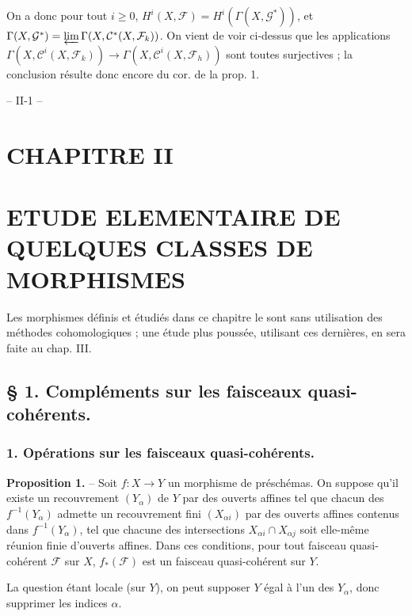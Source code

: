 On a donc pour tout $i \ge 0$, $H^i(X, \mathcal{F}) = H^i(\Gamma(X, \mathcal{G}^*))$, et $\Gamma(X, \mathcal{G}^*) = \varprojlim \Gamma(X, \mathcal{C}^*(X, \mathcal{F}_k))$. On vient de voir ci-dessus que les applications $\Gamma(X, \mathcal{C}^i(X, \mathcal{F}_k)) \to \Gamma(X, \mathcal{C}^i(X, \mathcal{F}_h))$ sont toutes surjectives ; la conclusion résulte donc encore du cor. de la prop. 1.

\newpage



\begin{center}
-- II-1 --
\end{center}

\section*{CHAPITRE II}
\section*{ETUDE ELEMENTAIRE DE QUELQUES CLASSES DE MORPHISMES}

Les morphismes définis et étudiés dans ce chapitre le sont sans utilisation des méthodes cohomologiques ; une étude plus poussée, utilisant ces dernières, en sera faite au chap. III.

\subsection*{§ 1. Compléments sur les faisceaux quasi-cohérents.}

\subsubsection*{1. Opérations sur les faisceaux quasi-cohérents.}

\textbf{Proposition 1.} -- Soit $f : X \to Y$ un morphisme de préschémas. On suppose qu'il existe un recouvrement $(Y_\alpha)$ de $Y$ par des ouverts affines tel que chacun des $f^{-1}(Y_\alpha)$ admette un recouvrement fini $(X_{\alpha i})$ par des ouverts affines contenus dans $f^{-1}(Y_\alpha)$, tel que chacune des intersections $X_{\alpha i} \cap X_{\alpha j}$ soit elle-même réunion finie d'ouverts affines. Dans ces conditions, pour tout faisceau quasi-cohérent $\mathcal{F}$ sur $X$, $f_*(\mathcal{F})$ est un faisceau quasi-cohérent sur $Y$.

La question étant locale (sur $Y$), on peut supposer $Y$ égal à l'un des $Y_\alpha$, donc supprimer les indices $\alpha$.

